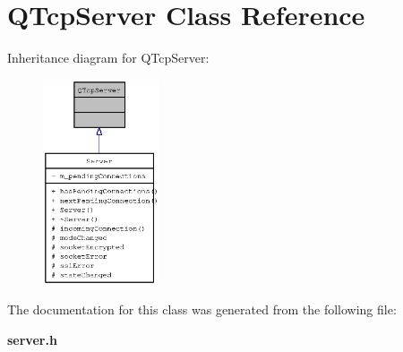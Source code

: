 \section{QTcpServer Class Reference}
\label{classQTcpServer}
Inheritance diagram for QTcpServer:\nopagebreak
\begin{figure}[H]
\begin{center}
\leavevmode
\includegraphics[width=97pt]{classQTcpServer__inherit__graph}
\end{center}
\end{figure}


The documentation for this class was generated from the following file:\begin{CompactItemize}
\item 
{\bf server.h}\end{CompactItemize}
